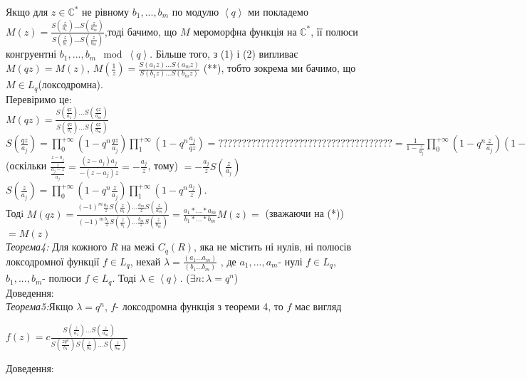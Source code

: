 \documentclass[12pt,a4paper]{article}
\begin{document}
Якщо для $z \in \mathbb{C}^{*}$ не рівному $b_{1},...,b_{m}$ по модулю $\left \langle q \right \rangle $ ми покладемо $M(z)=\frac{S(\frac{z}{a_{1}})...S(\frac{z}{a_{m}})}{S(\frac{z}{b_{1}})...S(\frac{z}{b_{m}})}$,тоді бачимо, що $M$ мероморфна функція на $\mathbb{C}^{*}$, її полюси конгруентні $b_{1},...,b_{m}\mod \left \langle q \right \rangle $. Більше того, з (1) і (2) випливає $M(qz)=M(z)$, $M(\frac{1}{z})=\frac{S(a_{1}z)...S(a_{m}z)}{S(b_{1}z)...S(b_{m}z)}$ (**), тобто зокрема ми бачимо, що $M\in L_{q}$(локсодромна).\\
Перевіримо це:\\
$M(qz)=\frac{S(\frac{qz}{a_{1}})...S(\frac{qz}{a_{m}})}{S(\frac{qz}{b_{1}})...S(\frac{qz}{b_{m}})}$\\
$S(\frac{qz}{a_{j}})= \prod_{0}^{+\infty } ( 1-q^{n}\frac{qz}{a_{j}} ) \prod_{1}^{+\infty }( 1-q^{n}\frac{a_{j}}{qz}) =?????????????????????????????????????= \frac{1}{1-\frac{z}{a_{j}}} \prod_{0}^{+\infty } ( 1-q^{n}\frac{z}{a_{j}}) (1-\frac{a_{j}}{z}) \prod_{1}^{+\infty }( 1-q^{n}\frac{a_{j}}{z})=$
(оскільки $ \frac{\frac{z-a_{j}}{z}}{\frac{a_{j}-z}{a_{j}}}= \frac{(z-a_{j})a_{j}}{-(z-a_{j})z}=-\frac{a_{j}}{z} $, тому)
$=-\frac{a_{j}}{z}S(\frac{z}{a_{j}})$\\
$S(\frac{z}{a_{j}})=  \prod_{0}^{+\infty } ( 1-q^{n}\frac{z}{a_{j}} ) \prod_{1}^{+\infty }( 1-q^{n}\frac{a_{j}}{z})$.\\
 Тодi
$M(qz)=\frac{ (-1)^{m} \frac{a_{1}}{z} S(\frac{z}{a_{1}})...\frac{a_{m}}{z} S(\frac{z}{a_{m}}) }{ (-1)^{m} \frac{b_{1}}{z} S(\frac{z}{b_{1}})...\frac{b_{m}}{z} S(\frac{z}{b_{m}}) }=\frac{ a_{1}*...*a_{m}}{b_{1}*...*b_{m}}M(z)=$ (зважаючи на (*)) $=M(z)$\\

\emph{Теорема4:} Для кожного $R$ на межі $C_{q}(R)$, яка не містить ні нулів, ні полюсів локсодромної функції $f\in L_{q}$, нехай $\lambda=\frac{(a_{1}...a_{m})}{(b_{1}...b_{m})}$ , де $a_{1},...,a_{m}$- нулі $f\in L_{q}$, $b_{1},...,b_{m}$- полюси $f\in L_{q}$. Тоді $\lambda\in \left \langle q \right \rangle$. ($ \exists n:\lambda =q^{n}$)\\
Доведення:
\\

\emph{Теорема5:}Якщо $\lambda =q^{n}$, $f$- локсодромна функція з теореми 4, то  $f$ має вигляд\\
 \begin{center}
 $f(z)= c\tfrac{S(\frac{z}{a_{1}})...S(\frac{z}{a_{m}})}{S(\frac{zq^{n}}{b_{1}})S(\frac{z}{b_{2}})...S(\frac{z}{b_{m}})}$
 \end{center}
Доведення:\\
\end{document}
